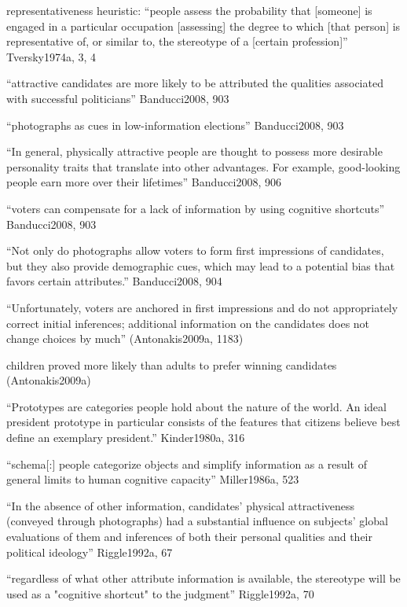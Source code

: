 representativeness heuristic: ``people assess the probability that [someone] is engaged in a particular occupation [assessing] the degree to which [that person] is representative of, or similar to, the stereotype of a [certain profession]'' Tversky1974a, 3, 4

``attractive candidates are more likely to be attributed the qualities associated with successful politicians'' Banducci2008, 903

``photographs as cues in low-information elections'' Banducci2008, 903

``In general, physically attractive people are thought to possess more desirable
personality traits that translate into other advantages. For example, good-looking people earn more over their lifetimes'' Banducci2008, 906

``voters can compensate for a lack of information by using cognitive shortcuts'' Banducci2008, 903


	``Not only do photographs allow voters to form first impressions of candidates, but they also provide demographic cues, which may lead to a potential bias that favors certain attributes.'' Banducci2008, 904

	``Unfortunately, voters are anchored in first impressions and do not appropriately correct initial inferences; additional information on the candidates does not change choices by much'' (Antonakis2009a, 1183)

	children proved more likely than adults to prefer winning candidates (Antonakis2009a)

``Prototypes are categories people hold about the nature of the world. An ideal president prototype in particular consists of the features that citizens believe best define an exemplary president.'' Kinder1980a, 316

``schema[:] people categorize objects and simplify information as a result of general limits to human cognitive capacity'' Miller1986a, 523

``In the absence of other information, candidates' physical attractiveness (conveyed through photographs) had a substantial influence on subjects' global evaluations of them and inferences of both their personal qualities and their political ideology'' Riggle1992a, 67

``regardless of what other attribute information is available, the stereotype will be used as a "cognitive shortcut" to the judgment'' Riggle1992a, 70

